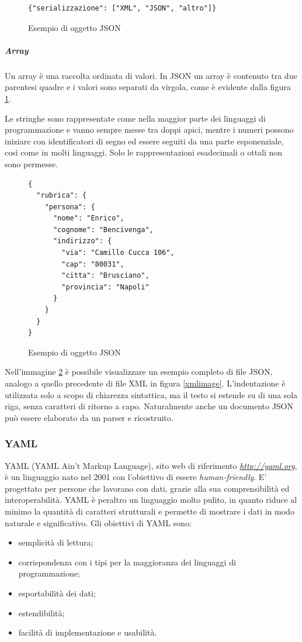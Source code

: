 \begin{figure}
\lstset{language=JSON}
\begin{lstlisting}
{"serializzazione": ["XML", "JSON", "altro"]}
\end{lstlisting}
\caption{Esempio di oggetto JSON\label{jsonarrayimage}}
\end{figure}

\subparagraph{Array}
Un array è una raccolta ordinata di valori. In JSON un array è contenuto tra due parentesi quadre e i valori sono separati da virgola, come è evidente dalla figura \ref{jsonarrayimage}.

Le stringhe sono rappresentate come nella maggior parte dei linguaggi di programmazione e vanno sempre messe tra doppi apici, mentre i numeri possono iniziare con identificatori di segno ed essere seguiti da una parte esponenziale, così come in molti linguaggi.
Solo le rappresentazioni esadecimali o ottali non sono permesse.
\begin{figure}
\lstset{language=JSON}
\begin{lstlisting}
{
  "rubrica": {
    "persona": {
      "nome": "Enrico",
      "cognome": "Bencivenga",
      "indirizzo": {
        "via": "Camillo Cucca 106",
        "cap": "80031",
        "citta": "Brusciano",
        "provincia": "Napoli"
      }
    }
  }
}
\end{lstlisting}
\caption{Esempio di oggetto JSON\label{jsonimage}}
\end{figure}

Nell'immagine \ref{jsonimage} è possibile visualizzare un esempio completo di file JSON, analogo a quello precedente di file XML in figura \ref{xmlimage}.
L'indentazione è utilizzata solo a scopo di chiarezza sintattica, ma il testo si estende su di una sola riga, senza caratteri di ritorno a capo.
Naturalmente anche un documento JSON può essere elaborato da un parser e ricostruito.

\subsubsection{YAML}
YAML (YAML Ain't Markup Language), sito web di riferimento \emph{\url{http://yaml.org}}, è un linguaggio nato nel 2001 con l'obiettivo di essere \textit{human-friendly}.
E' progettato per persone che lavorano con dati, grazie alla sua comprensibilità ed interoperabilità.
YAML è peraltro un linguaggio molto pulito, in quanto riduce al minimo la quantità di caratteri strutturali e permette di mostrare i dati in modo naturale e significativo.
Gli obiettivi di YAML sono:
\begin{itemize}
\item semplicità di lettura;
\item corrispondenza con i tipi per la maggioranza dei linguaggi di programmazione;
\item esportabilità dei dati;
\item estendibilità;
\item facilità di implementazione e usabilità.
\end{itemize}

